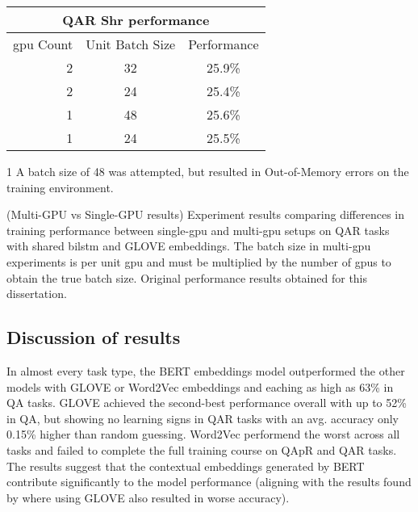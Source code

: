 \begin{table}[]
    \begin{threeparttable}
        \begin{tabular}{rc|c}
            \toprule
            \multicolumn{3}{c}{QA\rightarrow{}R Shr performance} \\
            \midrule
            \gls{gpu} Count & Unit Batch Size & Performance      \\
            2               & 32              & 25.9\%\tnote{1}  \\
            2               & 24              & 25.4\%           \\
            1               & 48              & 25.6\%           \\
            1               & 24              & 25.5\%           \\
            \bottomrule
        \end{tabular}
        \begin{tablenotes}
            \item[1] A batch size of 48 was attempted, but resulted in Out-of-Memory errors on the training environment.
        \end{tablenotes}
    \end{threeparttable}
    \captionsource(Multi-GPU vs Single-GPU results)
    {Experiment results comparing differences in training performance between single-\gls{gpu} and multi-\gls{gpu} setups on QA\rightarrow{}R tasks with shared \gls{bilstm} and GLOVE embeddings. The batch size in multi-\gls{gpu} experiments is per unit \gls{gpu} and must be multiplied by the number of \glspl{gpu} to obtain the true batch size. \label{tab:single-vs-multi-gpu-experiment-results}}
    {Original performance results obtained for this dissertation.}
\end{table}

\subsection{Discussion of results}
\label{subsec:discussion_of_results}

In almost every task type, the BERT embeddings model outperformed the other models with GLOVE or Word2Vec embeddings and eaching as high as 63\% in Q\rightarrow{}A tasks.
GLOVE achieved the second-best performance overall with up to 52\% in Q\rightarrow{}A, but showing no learning signs in Q\rightarrow{}AR tasks with an avg. accuracy only 0.15\% higher than random guessing.
Word2Vec performend the worst across all tasks and failed to complete the full training course on QAp\rightarrow{}R and Q\rightarrow{}AR tasks.
The results suggest that the contextual embeddings generated by BERT contribute significantly to the model performance (aligning with the results found by \citeauthor{zellers_recognition_2019} where using GLOVE also resulted in worse accuracy\cite{zellers_recognition_2019}).

